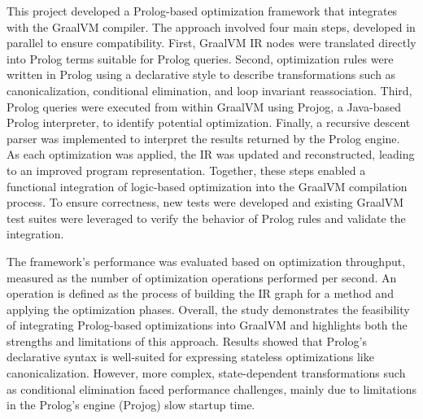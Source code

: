 This project developed a Prolog-based optimization framework that integrates with the GraalVM compiler. The approach involved four main steps, developed in parallel to ensure compatibility. 
First, GraalVM IR nodes were translated directly into Prolog terms suitable for Prolog queries.
Second, optimization rules were written in Prolog using a declarative style to describe transformations such as canonicalization, conditional elimination, and loop invariant reassociation. Third, Prolog queries were executed from within GraalVM using Projog, a Java-based Prolog interpreter, to identify potential optimization. Finally, a recursive descent parser was implemented to interpret the results returned by the Prolog engine. As each optimization was applied, the IR was updated and reconstructed, leading to an improved program representation. Together, these steps enabled a functional integration of logic-based optimization into the GraalVM compilation process. To ensure correctness, new tests were developed and existing GraalVM test suites were leveraged to verify the behavior of Prolog rules and validate the integration.

The framework’s performance was evaluated based on optimization throughput, measured as the number of optimization operations performed per second. An operation is defined as the process of building the IR graph for a method and applying the optimization phases. Overall, the study demonstrates the feasibility of integrating Prolog-based optimizations into GraalVM and highlights both the strengths and limitations of this approach. Results showed that Prolog’s declarative syntax is well-suited for expressing stateless optimizations like canonicalization. However, more complex, state-dependent transformations such as conditional elimination faced performance challenges, mainly due to limitations in the Prolog’s engine (Projog) slow startup time.
